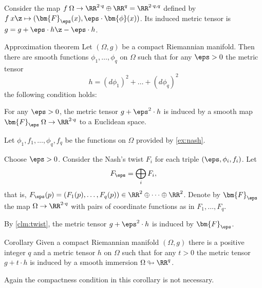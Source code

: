 Consider the map $f\:\Omega \to \RR^{2\cdot q}\oplus \RR^{q}=\RR^{2\cdot q,q}$
defined by
$f\:x\z\mapsto (\bm{F}_{\eps}(x),\eps\cdot\bm{\phi}(x))$.
Its induced metric tensor is $g=g+\eps\cdot h\z-\eps\cdot h$.
\qeds















\begin{thm}{Approximation theorem}\label{thm:approx}
Let $(\Omega ,g)$ be a compact Riemannian manifold.
Then there are smooth functions $\phi_1,\dots, \phi_q$ on $\Omega$ such that 
for any $\eps>0$ the metric tensor 
\[h=(d\phi_1)^2+\dots+(d\phi_q)^2\]
the following condition holds:

For any $\eps>0$, the metric tensor $g+\eps^2\cdot h$ is induced by a smooth map $\bm{F}_\eps\:\Omega \to \RR^{2\cdot q}$ to a Euclidean space.
\end{thm}

Let $\phi_1,f_1,\dots ,\phi_q,f_q$ be the functions on $\Omega$ provided by \ref{ex:nash}.

Choose $\eps>0$. 
Consider the Nash's twist $F_i$ for each triple $(\eps,\phi_i,f_i)$.
Let
\[F_\eps=\bigoplus_i F_i,\]
that is, $F_\eps(p)=(F_1(p),\dots, F_q(p))\in \RR^2\oplus\dots\oplus\RR^2$.
Denote by $\bm{F}_\eps$ the map $\Omega \to\RR^{2\cdot q}$ with pairs of coordinate functions as in $F_1,\dots, F_q$.

By \ref{clm:twist}, the metric tensor $g+\eps^2\cdot h$ is induced by $\bm{F}_\eps$.
\qeds

\begin{thm}{Corollary}
Given a compact Riemannian manifold $(\Omega,g)$ there is a positive integer $q$ and a metric tensor $h$ on $\Omega$ such that for any $t>0$ the metric tensor $g+t\cdot h$ is induced by a  
 smooth immersion $\Omega\looparrowright \RR^q$.
\end{thm}

Again the compactness condition in this corollary is not necessary.





















